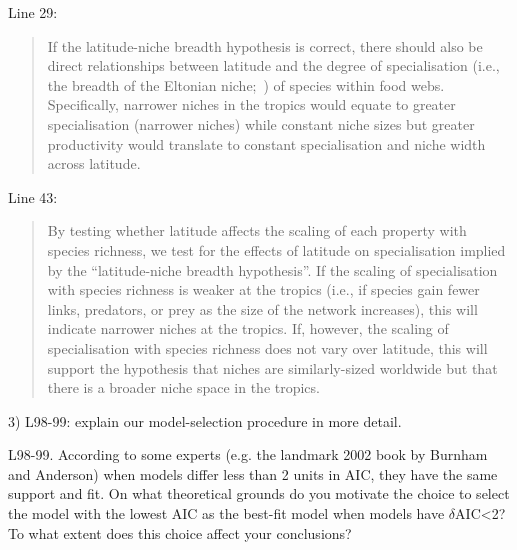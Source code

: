 \documentclass[12pt]{letter}
\newenvironment{refquote}{\bigskip \begin{it}}{\end{it}\smallskip}
\begin{document}
 
  Line 29:

  \begin{quotation}

  If the latitude-niche breadth hypothesis is correct, there should also be
  direct relationships between latitude and the degree of specialisation
  (i.e., the breadth of the Eltonian niche;~\citealp{Elton1927}) of species within
  food webs. Specifically, narrower niches in the tropics would equate to
  greater specialisation (narrower niches) while constant niche sizes but
  greater productivity would translate to constant specialisation and niche
  width across latitude.

  \end{quotation}

  \smallskip

  Line 43:

  \begin{quotation}

  By testing whether latitude affects the scaling of each property with
  species richness, we test for the effects of latitude on specialisation
  implied by the ``latitude-niche breadth hypothesis''. If the scaling of
  specialisation with species richness is weaker at the tropics (i.e., if
  species gain fewer links, predators, or prey as the size of the network
  increases), this will indicate narrower niches at the tropics. If, however,
  the scaling of specialisation with species richness does not vary over
  latitude, this will support the hypothesis that niches are similarly-sized
  worldwide but that there is a broader niche space in the tropics.

  \end{quotation}


  3) L98-99: explain our model-selection procedure in more detail.

  \begin{refquote}

    L98-99. According to some experts (e.g. the landmark 2002 book by Burnham
    and Anderson) when models differ less than 2 units in AIC, they have the
    same support and fit. On what theoretical grounds do you motivate the
    choice to select the model with the lowest AIC as the best-fit model when
    models have $\delta$AIC\textless2? To what extent does this choice affect your
    conclusions?

  \end{refquote}
\end{document}
